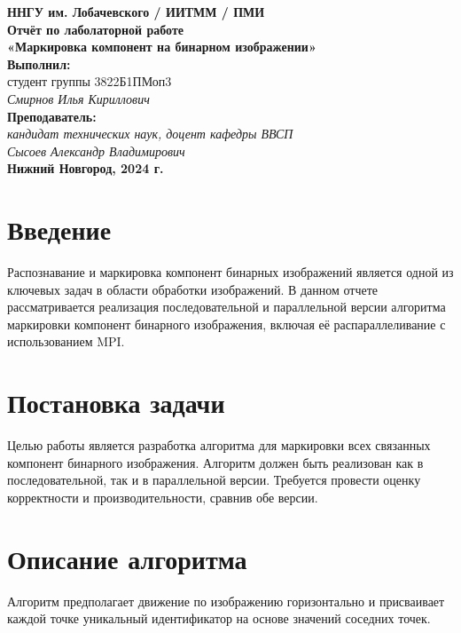 \documentclass[a4paper,12pt]{article}
\begin{document}
\begin{titlepage}
    \begin{center}
        \large 
        \textbf{ННГУ им. Лобачевского / ИИТММ / ПМИ}\\[0.5cm]

        \vspace{4cm}
        \textbf{\Large Отчёт по лаболаторной работе}\\
        \textbf{\large «Маркировка компонент на бинарном изображении»}\\[3cm]

        \vspace{3cm}
        \textbf{Выполнил:}\\
        студент группы 3822Б1ПМоп3 \\
        \textit{Смирнов Илья Кириллович}\\[1cm]

        \textbf{Преподаватель:}\\
        \textit{кандидат технических наук, доцент кафедры ВВСП}\\
        \textit{Сысоев Александр Владимирович}\\[2cm]

        \vfill
        \textbf{Нижний Новгород, 2024 г.}
    \end{center}
\end{titlepage}

\tableofcontents
\newpage

\section{Введение}
Распознавание и маркировка компонент бинарных изображений является одной из ключевых задач в области обработки изображений. В данном отчете рассматривается реализация последовательной и параллельной версии алгоритма маркировки компонент бинарного изображения, включая её распараллеливание с использованием MPI.

\section{Постановка задачи}
Целью работы является разработка алгоритма для маркировки всех связанных компонент бинарного изображения. Алгоритм должен быть реализован как в последовательной, так и в параллельной версии. Требуется провести оценку корректности и производительности, сравнив обе версии.

\section{Описание алгоритма}
Алгоритм предполагает движение по изображению горизонтально и присваивает каждой точке уникальный идентификатор на основе значений соседних точек.
\end{document}
